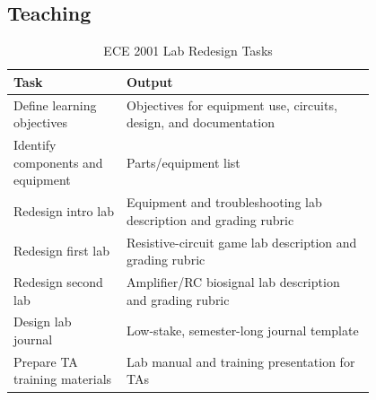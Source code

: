 \documentclass[custom, sidenote, final]{cls/oneproposal}
\begin{document}
\newpage

\subsection{Teaching}


\begin{table}[htbp]
    \centering
    \footnotesize
    \caption{ECE 2001 Lab Redesign Tasks}\label{tab:ece2001-lab-tasks}
    \begin{tabular}{m{0.25\linewidth} p{0.55\linewidth}}
        \toprule
        \textbf{Task}                     & \textbf{Output}                                                   \\
        \midrule
        Define learning objectives        & Objectives for equipment use, circuits, design, and documentation \\
        \midrule
        Identify components and equipment &
        Parts/equipment list                                                                                  \\
        \midrule
        Redesign intro lab                & Equipment and troubleshooting lab description and grading rubric  \\
        Redesign first lab                & Resistive-circuit game lab description and grading rubric         \\
        \midrule
        Redesign second lab               & Amplifier/RC biosignal lab description and grading rubric         \\
        \midrule
        Design lab journal                & Low-stake, semester-long journal template                         \\
        \midrule
        Prepare TA training materials     & Lab manual and training presentation for TAs                      \\
        \bottomrule
    \end{tabular}
\end{table}


\end{document}
